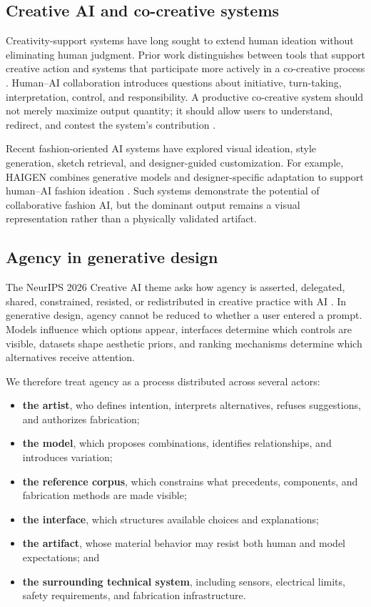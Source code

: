 \documentclass{article}
\begin{document}
\subsection{Creative AI and co-creative systems}

Creativity-support systems have long sought to extend human ideation without
eliminating human judgment. Prior work distinguishes between tools that support
creative action and systems that participate more actively in a co-creative
process \citep{lubart2005,frich2019}. Human--AI collaboration introduces
questions about initiative, turn-taking, interpretation, control, and
responsibility. A productive co-creative system should not merely maximize
output quantity; it should allow users to understand, redirect, and contest the
system's contribution \citep{amershi2019,shneiderman2020}.

Recent fashion-oriented AI systems have explored visual ideation, style
generation, sketch retrieval, and designer-guided customization. For example,
HAIGEN combines generative models and designer-specific adaptation to support
human--AI fashion ideation \citep{jiang2024haigen}. Such systems demonstrate the
potential of collaborative fashion AI, but the dominant output remains a
visual representation rather than a physically validated artifact.

\subsection{Agency in generative design}

The NeurIPS 2026 Creative AI theme asks how agency is asserted, delegated,
shared, constrained, resisted, or redistributed in creative practice with AI
\citep{neurips2026creative}. In generative design, agency cannot be reduced to
whether a user entered a prompt. Models influence which options appear,
interfaces determine which controls are visible, datasets shape aesthetic
priors, and ranking mechanisms determine which alternatives receive attention.

We therefore treat agency as a process distributed across several actors:

\begin{itemize}[leftmargin=*]
    \item \textbf{the artist}, who defines intention, interprets alternatives,
    refuses suggestions, and authorizes fabrication;
    \item \textbf{the model}, which proposes combinations, identifies
    relationships, and introduces variation;
    \item \textbf{the reference corpus}, which constrains what precedents,
    components, and fabrication methods are made visible;
    \item \textbf{the interface}, which structures available choices and
    explanations;
    \item \textbf{the artifact}, whose material behavior may resist both human
    and model expectations; and
    \item \textbf{the surrounding technical system}, including sensors,
    electrical limits, safety requirements, and fabrication infrastructure.
\end{itemize}
\end{document}
